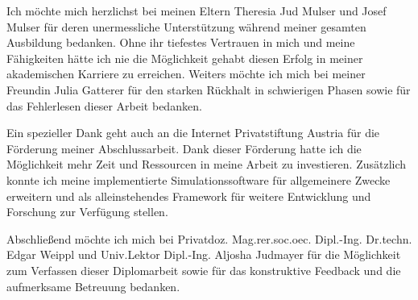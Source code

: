 Ich möchte mich herzlichst bei meinen Eltern Theresia Jud Mulser und Josef Mulser für deren unermessliche Unterstützung während meiner gesamten Ausbildung bedanken.
Ohne ihr tiefestes Vertrauen in mich und meine Fähigkeiten hätte ich nie die Möglichkeit gehabt diesen Erfolg in meiner akademischen Karriere zu erreichen.
Weiters möchte ich mich bei meiner Freundin Julia Gatterer für den starken Rückhalt in schwierigen Phasen sowie für das Fehlerlesen dieser Arbeit bedanken.

\bigskip

Ein spezieller Dank geht auch an die Internet Privatstiftung Austria für die Förderung meiner Abschlussarbeit.
Dank dieser Förderung hatte ich die Möglichkeit mehr Zeit und Ressourcen in meine Arbeit zu investieren.
Zusätzlich konnte ich meine implementierte Simulationssoftware für allgemeinere Zwecke erweitern und als alleinstehendes Framework für weitere Entwicklung und Forschung zur Verfügung stellen.

Abschließend möchte ich mich bei Privatdoz. Mag.rer.soc.oec. Dipl.-Ing. Dr.techn. Edgar Weippl und Univ.Lektor Dipl.-Ing. Aljosha Judmayer für die Möglichkeit zum Verfassen dieser Diplomarbeit sowie für das konstruktive Feedback und die aufmerksame Betreuung bedanken.
